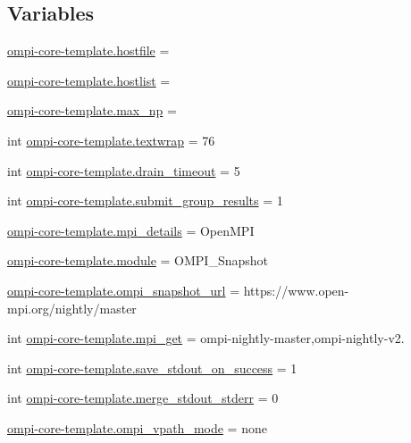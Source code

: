 \subsection*{Variables}
\begin{DoxyCompactItemize}
\item 
\hyperlink{namespaceompi-core-template_aed8287cfdf838bf38fe4e39ae97c2e9c}{ompi-\/core-\/template.\-hostfile} =
\item 
\hyperlink{namespaceompi-core-template_a398a79c984b3635ab67f829c9865510e}{ompi-\/core-\/template.\-hostlist} =
\item 
\hyperlink{namespaceompi-core-template_aef06f55877b195b98c9e7e6689f18064}{ompi-\/core-\/template.\-max\-\_\-np} =
\item 
int \hyperlink{namespaceompi-core-template_aeb49f8ad6e70070ee42d28d172cf2055}{ompi-\/core-\/template.\-textwrap} = 76
\item 
int \hyperlink{namespaceompi-core-template_a9b0a0d844979f7c5b1aa019aa4ddf2f1}{ompi-\/core-\/template.\-drain\-\_\-timeout} = 5
\item 
int \hyperlink{namespaceompi-core-template_ad901c84f6aa10668dc9e69ba586dfbf4}{ompi-\/core-\/template.\-submit\-\_\-group\-\_\-results} = 1
\item 
\hyperlink{namespaceompi-core-template_ae991e705825a3a258264eba6c0aecc15}{ompi-\/core-\/template.\-mpi\-\_\-details} = Open\-M\-P\-I
\item 
\hyperlink{namespaceompi-core-template_a0740abf47d69d62e964af74e156b0e88}{ompi-\/core-\/template.\-module} = O\-M\-P\-I\-\_\-\-Snapshot
\item 
\hyperlink{namespaceompi-core-template_a931771a1ede0f79aca611cdb2d669fee}{ompi-\/core-\/template.\-ompi\-\_\-snapshot\-\_\-url} = https\-://www.\-open-\/mpi.\-org/nightly/master
\item 
int \hyperlink{namespaceompi-core-template_a2a9de4b31652c233bacb61b1fd294c34}{ompi-\/core-\/template.\-mpi\-\_\-get} = ompi-\/nightly-\/master,ompi-\/nightly-\/v2.
\item 
int \hyperlink{namespaceompi-core-template_a5c4b457cac4bfd0c265d8e85f6ad4d30}{ompi-\/core-\/template.\-save\-\_\-stdout\-\_\-on\-\_\-success} = 1
\item 
int \hyperlink{namespaceompi-core-template_aa5933d429ca66125d5d2ae8d0c6a1228}{ompi-\/core-\/template.\-merge\-\_\-stdout\-\_\-stderr} = 0
\item 
\hyperlink{namespaceompi-core-template_a59d3abf6ca7c94e790fd49325d3701f0}{ompi-\/core-\/template.\-ompi\-\_\-vpath\-\_\-mode} = none

\end{DoxyCompactItemize}
